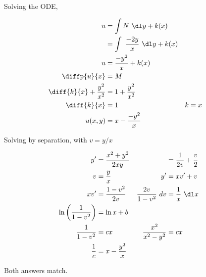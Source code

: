 \begin{enumerate}
\begin{enumerate}
                    Solving the ODE,

                    \begin{align}
                        u                                 & = \int N\ \dl y+ k(x)                        \\
                                                          & = \int\ \frac{-2y}{x}\ \dl y+ k(x)           \\
                        u                                 & = \frac{-y^{2}}{x} + k(x)                    \\
                        \diffp{u}{x}                      & = M                                          \\
                        \diff{k}{x} + \frac{y^{2}}{x^{2}} & = 1 + \frac{y^{2}}{x^{2}}                    \\
                        \diff{k}{x}                       & = 1                                & k & = x \\
                        u(x, y)                           & = x - \frac{-y^{2}}{x}
                    \end{align}

                    Solving by separation, with $ v = y/x $

                    \begin{align}
                        y'                                     & = \frac{x^{2} + y^{2}}{2xy} &                             & = \frac{1}{2v} + \frac{v}{2} \\
                        v                                      & = \frac{y}{x}               & y'                          & = xv' + v                    \\
                        xv'                                    & =  \frac{1 - v^{2}}{2v}     & \frac{2v}{1 - v^{2}}\ dv    & = \frac{1}{x}\ \dl x         \\
                        \ln \left( \frac{1}{1 - v^{2}} \right) & = \ln x + b                                                                              \\
                        \frac{1}{1 - v^{2}}                    & = cx                        & \frac{x^{2}}{x^{2} - y^{2}} & = cx                         \\
                        \frac{1}{c}                            & = x - \frac{y^{2}}{x}
                    \end{align}

                    Both answers match.


\end{enumerate}
\end{enumerate}
